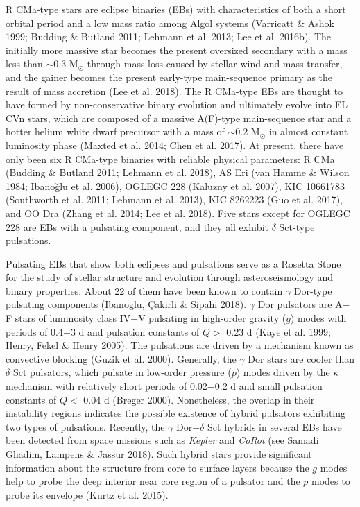 \documentclass[useAMS,usenatbib,usegraphicx]{mn2e}
\begin{document}
R CMa-type stars are eclipse binaries (EBs) with characteristics of both a short orbital period and a low mass ratio 
among Algol systems (Varricatt \& Ashok 1999; Budding \& Butland 2011; Lehmann et al. 2013; Lee et al. 2016b). 
The initially more massive star becomes the present oversized secondary with a mass less than $\sim$0.3 M$_\odot$ through 
mass loss caused by stellar wind and mass transfer, and the gainer becomes the present early-type main-sequence primary as 
the result of mass accretion (Lee et al. 2018). The R CMa-type EBs are thought to have formed by non-conservative binary 
evolution and ultimately evolve into EL CVn stars, which are composed of a massive A(F)-type main-sequence star and 
a hotter helium white dwarf precursor with a mass of $\sim$0.2 M$_\odot$ in almost constant luminosity phase 
(Maxted et al. 2014; Chen et al. 2017). At present, there have only been six R CMa-type binaries with reliable physical 
parameters: R CMa (Budding \& Butland 2011; Lehmann et al. 2018), AS Eri (van Hamme \& Wilson 1984; Ibano\v{g}lu et al. 2006), 
OGLEGC 228 (Kaluzny et al. 2007), KIC 10661783 (Southworth et al. 2011; Lehmann et al. 2013), KIC 8262223 (Guo et al. 2017), 
and OO Dra (Zhang et al. 2014; Lee et al. 2018). Five stars except for OGLEGC 228 are EBs with a pulsating component, and 
they all exhibit $\delta$ Sct-type pulsations. 

Pulsating EBs that show both eclipses and pulsations serve as a Rosetta Stone for the study of stellar structure and 
evolution through asteroseismology and binary properties. About 22 of them have been known to contain $\gamma$ Dor-type 
pulsating components (Ibanoglu, \c Cakirli \& Sipahi 2018). $\gamma$ Dor pulsators are A$-$F stars of luminosity class 
IV$-$V pulsating in high-order gravity ($g$) modes with periods of 0.4$-$3 d and pulsation constants of $Q >$ 0.23 d 
(Kaye et al. 1999; Henry, Fekel \& Henry 2005). The pulsations are driven by a mechanism known as convective blocking 
(Guzik et al. 2000). Generally, the $\gamma$ Dor stars are cooler than $\delta$ Sct pulsators, which pulsate in 
low-order pressure ($p$) modes driven by the $\kappa$ mechanism with relatively short periods of 0.02$-$0.2 d and 
small pulsation constants of $Q <$ 0.04 d (Breger 2000). Nonetheless, the overlap in their instability regions 
indicates the possible existence of hybrid pulsators exhibiting two types of pulsations. Recently, 
the $\gamma$ Dor$-\delta$ Sct hybrids in several EBs have been detected from space missions such as {\it Kepler} and 
{\it CoRot} (see Samadi Ghadim, Lampens \& Jassur 2018). Such hybrid stars provide significant information about 
the structure from core to surface layers because the $g$ modes help to probe the deep interior near core region of 
a pulsator and the $p$ modes to probe its envelope (Kurtz et al. 2015). 
\end{document}
